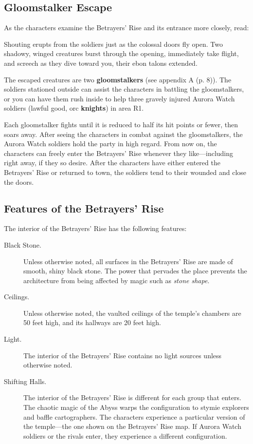\documentclass[a4paper, 11pt, bg=full, twocolumn, nooutline]{dndbook}
\begin{document}
\subsection{Gloomstalker Escape}

As the characters examine the Betrayers' Rise and its entrance more closely, read:

\begin{DndReadAloud}
Shouting erupts from the soldiers just as the colossal doors fly open. Two shadowy, winged creatures burst through the opening, immediately take flight, and screech as they dive toward you, their ebon talons extended.
\end{DndReadAloud}

The escaped creatures are two \textbf{gloomstalkers} (see appendix A (p. 8)). The soldiers stationed outside can assist the characters in battling the gloomstalkers, or you can have them rush inside to help three gravely injured Aurora Watch soldiers (lawful good, orc \textbf{knights}) in area R1.

Each gloomstalker fights until it is reduced to half its hit points or fewer, then soars away. After seeing the characters in combat against the gloomstalkers, the Aurora Watch soldiers hold the party in high regard. From now on, the characters can freely enter the Betrayers' Rise whenever they like---including right away, if they so desire. After the characters have either entered the Betrayers' Rise or returned to town, the soldiers tend to their wounded and close the doors.

\subsection{Features of the Betrayers' Rise}

The interior of the Betrayers' Rise has the following features:

\begin{description}
\item[Black Stone.] Unless otherwise noted, all surfaces in the Betrayers' Rise are made of smooth, shiny black stone. The power that pervades the place prevents the architecture from being affected by magic such as \textit{stone shape}.
\item[Ceilings.] Unless otherwise noted, the vaulted ceilings of the temple's chambers are 50 feet high, and its hallways are 20 feet high.
\item[Light.] The interior of the Betrayers' Rise contains no light sources unless otherwise noted.
\item[Shifting Halls.] The interior of the Betrayers' Rise is different for each group that enters. The chaotic magic of the Abyss warps the configuration to stymie explorers and baffle cartographers. The characters experience a particular version of the temple---the one shown on the Betrayers' Rise map. If Aurora Watch soldiers or the rivals enter, they experience a different configuration.
\end{description}
\end{document}
